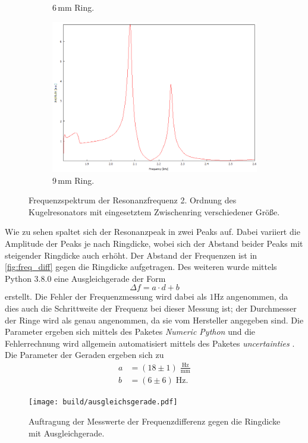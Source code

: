 \begin{figure}
\begin{subfigure}[b]{0.33\textwidth}
        \caption{6\,mm Ring.}
    \end{subfigure}
    \hfill
    \begin{subfigure}[b]{0.33\textwidth}
        \centering
        \includegraphics[width=\textwidth]{data/2_4/9mm.png}
        \caption{9\,mm Ring.}
    \end{subfigure}
    \hfill
    \caption{Frequenzspektrum der Resonanzfrequenz 2. Ordnung des Kugelresonators mit eingesetztem Zwischenring verschiedener Größe.}
    \label{fig:ringe}
\end{figure}
Wie zu sehen spaltet sich der Resonanzpeak in zwei Peaks auf. Dabei variiert die Amplitude 
der Peaks je nach Ringdicke, wobei sich der Abstand beider Peaks mit steigender
Ringdicke auch erhöht. Der Abstand der Frequenzen ist in \autoref{fig:freq_diff} gegen die 
Ringdicke aufgetragen. Des weiteren wurde mittels Python 3.8.0 eine Ausgleichgerade der Form
\begin{equation*}
     \Delta f = a \cdot d + b
\end{equation*}
erstellt. Die Fehler der Frequenzmessung wird dabei als $1$\;Hz angenommen, da dies auch die 
Schrittweite der Frequenz bei dieser Messung ist; der Durchmesser der Ringe wird als genau
angenommen, da sie vom Hersteller angegeben sind. Die Parameter ergeben sich mittels des Paketes
\textit{Numeric Python} \cite{numpy} und die Fehlerrechnung wird allgemein automatisiert 
mittels des Paketes \textit{uncertainties} \cite{uncertainties}.
Die Parameter der Geraden ergeben sich zu 
\begin{align*}
    a &= (18 \pm 1) \;\frac{\text{Hz}}{\text{mm}} \\
    b &= ( 6 \pm 6) \;\text{Hz}.
\end{align*} 
\begin{figure}[h]
    \centering 
    \texttt{[image: build/ausgleichsgerade.pdf]}
    \caption{Auftragung der Messwerte der Frequenzdifferenz gegen die Ringdicke mit Ausgleichgerade.}
    \label{fig:freq_diff}
\end{figure}

